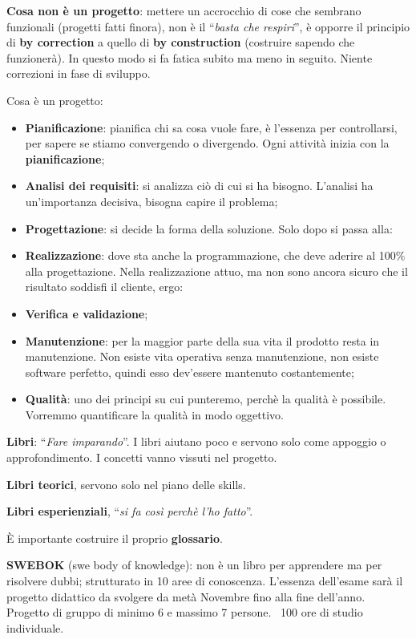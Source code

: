 \textbf{Cosa non è un progetto}: mettere un accrocchio di cose che sembrano funzionali (progetti fatti finora), non è il ``\textit{basta che respiri}'', è opporre il principio di \textbf{by correction} a quello di \textbf{by construction} (costruire sapendo che funzionerà). In questo modo si fa fatica subito ma meno in seguito. Niente correzioni in fase di sviluppo.

Cosa è un progetto:

\begin{itemize}

	\item \textbf{Pianificazione}: pianifica chi sa cosa vuole fare, è l'essenza per controllarsi, per sapere se stiamo convergendo o divergendo. Ogni attività inizia con la \textbf{pianificazione};
	\item \textbf{Analisi dei requisiti}: si analizza ciò di cui si ha bisogno. L'analisi ha un'importanza decisiva, bisogna capire il problema;
	\item \textbf{Progettazione}: si decide la forma della soluzione. Solo dopo si passa alla:
	\item \textbf{Realizzazione}: dove sta anche la programmazione, che deve aderire al 100\% alla progettazione. Nella realizzazione attuo, ma non sono ancora sicuro che il risultato soddisfi il cliente, ergo:
	\item \textbf{Verifica e validazione};
	\item \textbf{Manutenzione}: per la maggior parte della sua vita il prodotto resta in manutenzione. Non esiste vita operativa senza manutenzione, non esiste software perfetto, quindi esso dev'essere mantenuto costantemente;
	\item \textbf{Qualità}: uno dei principi su cui punteremo, perchè la qualità è possibile. Vorremmo quantificare la qualità in modo oggettivo.

\end{itemize}

\textbf{Libri}: ``\textit{Fare imparando}''. I libri aiutano poco e servono solo come appoggio o approfondimento. I concetti vanno vissuti nel progetto.

\textbf{Libri teorici}, servono solo nel piano delle skills.

\textbf{Libri esperienziali}, ``\textit{si fa così perchè l'ho fatto}''.

È importante costruire il proprio \textbf{glossario}.

\textbf{SWEBOK} (swe body of knowledge): non è un libro per apprendere ma per risolvere dubbi; strutturato in 10 aree di conoscenza. L'essenza dell'esame sarà il progetto didattico da svolgere da metà Novembre fino alla fine dell'anno. Progetto di gruppo di minimo 6 e massimo 7 persone. ~100 ore di studio individuale.

